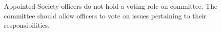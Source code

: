 \begin{clause}
    Appointed Society officers do not hold a voting role on committee. The committee should allow officers to vote on issues pertaining to their responsibilities.
\end{clause}

